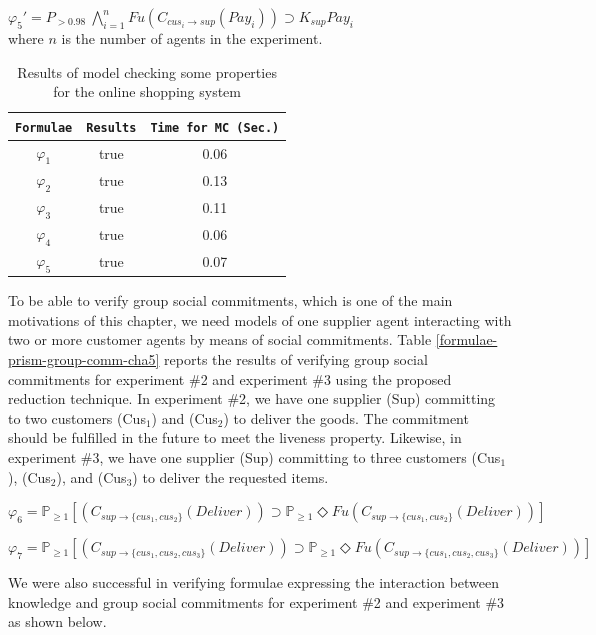 $\varphi_5' = P_{>0.98}~ \bigwedge\limits_{i=1}^n Fu (C_{cus_i\to sup} (Pay_i)) \supset K_{sup}
Pay_i$\\
%
where $n$ is the number of agents in the experiment.

\begin{table}%
\centering \caption{Results of model checking some properties for the online shopping system} \label{formulae-prism-results-cha5}
\begin{tabular}{|c|c|c|}
\hline
\texttt{Formulae} &   \texttt{Results}    & \texttt{Time for MC (Sec.)} \\
\hline\hline
$\varphi_1$                &true           &0.06  \\
\hline
$\varphi_2$                &true           &0.13  \\
\hline
$\varphi_3$                &true           &0.11  \\
\hline
$\varphi_4$                &true           &0.06  \\
\hline
$\varphi_5$                &true           &0.07  \\
\hline
\end{tabular}
\end{table}


To be able to verify group social commitments, which is one of the
main motivations of this chapter, we need models of one supplier
agent interacting with two or more customer agents by means of
social commitments. Table \ref{formulae-prism-group-comm-cha5}
reports the results of verifying group social commitments for
experiment \#2 and experiment \#3 using the proposed
reduction technique. In experiment \#2, we have one supplier (Sup) committing to two customers (Cus$_1$) and (Cus$_2$) to deliver the goods. The commitment should be fulfilled in the future to meet the liveness property. Likewise, in experiment \#3, we have one supplier (Sup) committing to three customers (Cus$_1$), (Cus$_2$), and (Cus$_3$) to deliver the requested items.

\noindent $\varphi_6= \mathbb{P}_{\geq1}[(C_{sup \to \{cus_1,cus_2\}} (Deliver))\supset \mathbb{P}_{\geq1}\Diamond Fu(C_{sup \to \{cus_1,cus_2\}} (Deliver))]$

\noindent $\varphi_7= \mathbb{P}_{\geq1}[(C_{sup \to \{cus_1,cus_2,cus_3\}} (Deliver))\supset \mathbb{P}_{\geq1}\Diamond Fu(C_{sup \to \{cus_1,cus_2,cus_3\}} (Deliver))]$

\noindent We were also successful in verifying formulae expressing the interaction between knowledge and group social commitments for experiment \#2 and experiment \#3 as shown below.

